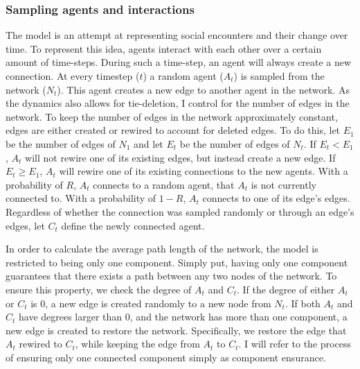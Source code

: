 \documentclass{article}
\begin{document}
\subsubsection{Sampling agents and interactions}

The model is an attempt at representing social encounters and their change over time. 
To represent this idea, agents interact with each other over a certain amount of time-steps. 
During such a time-step, an agent will always create a new connection. 
At every timestep ($t$) a random agent ($A_t$) is sampled from the network ($N_t$). This agent creates a new edge to another agent in the network. 
As the dynamics also allows for tie-deletion, I control for the number of edges in the network.
To keep the number of edges in the network approximately constant, edges are either created or rewired to account for deleted edges. 
To do this, let $E_1$ be the number of edges of $N_1$ and let $E_t$ be the number of edges of $N_t$. 
If $E_t < E_1$, $A_t$ will not rewire one of its existing edges, but instead create a new edge. If $E_t \geq E_1$, $A_t$ will rewire one of its existing connections to the new agents.
With a probability of $R$, $A_t$ connects to a random agent, that $A_t$ is not currently connected to. 
With a probability of $1-R$, $A_t$ connects to one of its edge's edges. Regardless of whether the connection was sampled randomly or through an edge's edges, let $C_t$ define the newly connected agent.

In order to calculate the average path length of the network, the model is restricted to being only one component. 
Simply put, having only one component guarantees that there exists a path between any two nodes of the network.
To ensure this property, we check the degree of $A_t$ and $C_t$. If the degree of either $A_t$ or $C_t$ is 0, a new edge is created randomly to a new node from $N_t$.
If both $A_t$ and $C_t$ have degrees larger than 0, and the network has more than one component, a new edge is created to restore the network. Specifically, we restore the edge that $A_t$ rewired to $C_t$, while keeping the edge from $A_t$ to $C_t$.
I will refer to the process of ensuring only one connected component simply as component ensurance. 
\end{document}

